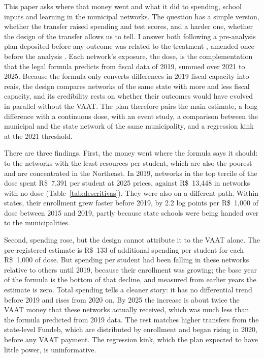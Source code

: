 \documentclass[11pt]{article}
\newcommand{\reais}{R\$}
\begin{document}
This paper asks where that money went and what it did to spending, school inputs and learning in the municipal networks. The question has a simple version, whether the transfer raised spending and test scores, and a harder one, whether the design of the transfer allows us to tell. I answer both following a pre-analysis plan deposited before any outcome was related to the treatment \citep{cunha2026pap}, amended once before the analysis \citep{cunha2026add}. Each network's exposure, the dose, is the complementation that the legal formula predicts from fiscal data of 2019, summed over 2021 to 2025. Because the formula only converts differences in 2019 fiscal capacity into reais, the design compares networks of the same state with more and less fiscal capacity, and its credibility rests on whether their outcomes would have evolved in parallel without the VAAT. The plan therefore pairs the main estimate, a long difference with a continuous dose, with an event study, a comparison between the municipal and the state network of the same municipality, and a regression kink at the 2021 threshold.

There are three findings. First, the money went where the formula says it should: to the networks with the least resources per student, which are also the poorest and are concentrated in the Northeast. In 2019, networks in the top tercile of the dose spent \reais{}~7,391 per student at 2025 prices, against \reais{}~13,448 in networks with no dose (Table~\ref{tab:descritivas}). They were also on a different path. Within states, their enrollment grew faster before 2019, by 2.2 log points per \reais{}~1,000 of dose between 2015 and 2019, partly because state schools were being handed over to the municipalities.

Second, spending rose, but the design cannot attribute it to the VAAT alone. The pre-registered estimate is \reais{}~133 of additional spending per student for each \reais{}~1,000 of dose. But spending per student had been falling in these networks relative to others until 2019, because their enrollment was growing; the base year of the formula is the bottom of that decline, and measured from earlier years the estimate is zero. Total spending tells a cleaner story: it has no differential trend before 2019 and rises from 2020 on. By 2025 the increase is about twice the VAAT money that these networks actually received, which was much less than the formula predicted from 2019 data. The rest matches higher transfers from the state-level Fundeb, which are distributed by enrollment and began rising in 2020, before any VAAT payment. The regression kink, which the plan expected to have little power, is uninformative.
\end{document}
